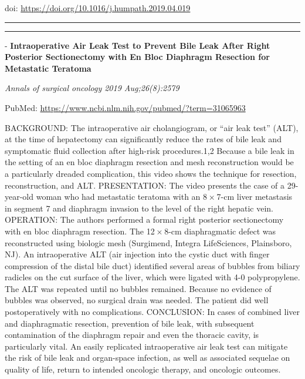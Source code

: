 \documentclass[]{article}
\begin{document}
doi: \url{https://doi.org/10.1016/j.humpath.2019.04.019}

{}

{}

\begin{center}\rule{0.5\linewidth}{\linethickness}\end{center}

\begin{center}\rule{0.5\linewidth}{\linethickness}\end{center}

 - \textbf{Intraoperative Air Leak Test to Prevent Bile Leak After Right
Posterior Sectionectomy with En Bloc Diaphragm Resection for Metastatic
Teratoma}

\emph{Annals of surgical oncology 2019 Aug;26(8):2579}

PubMed: \url{https://www.ncbi.nlm.nih.gov/pubmed/?term=31065963}

BACKGROUND: The intraoperative air cholangiogram, or ``air leak test''
(ALT), at the time of hepatectomy can significantly reduce the rates of
bile leak and symptomatic fluid collection after high-risk
procedures.1,2 Because a bile leak in the setting of an en bloc
diaphragm resection and mesh reconstruction would be a particularly
dreaded complication, this video shows the technique for resection,
reconstruction, and ALT. PRESENTATION: The video presents the case of a
29-year-old woman who had metastatic teratoma with an 8 × 7-cm liver
metastasis in segment 7 and diaphragm invasion to the level of the right
hepatic vein. OPERATION: The authors performed a formal right posterior
sectionectomy with en bloc diaphragm resection. The 12 × 8-cm
diaphragmatic defect was reconstructed using biologic mesh (Surgimend,
Integra LifeSciences, Plainsboro, NJ). An intraoperative ALT (air
injection into the cystic duct with finger compression of the distal
bile duct) identified several areas of bubbles from biliary radicles on
the cut surface of the liver, which were ligated with 4-0 polypropylene.
The ALT was repeated until no bubbles remained. Because no evidence of
bubbles was observed, no surgical drain was needed. The patient did well
postoperatively with no complications. CONCLUSION: In cases of combined
liver and diaphragmatic resection, prevention of bile leak, with
subsequent contamination of the diaphragm repair and even the thoracic
cavity, is particularly vital. An easily replicated intraoperative air
leak test can mitigate the risk of bile leak and organ-space infection,
as well as associated sequelae on quality of life, return to intended
oncologic therapy, and oncologic outcomes.
\end{document}
